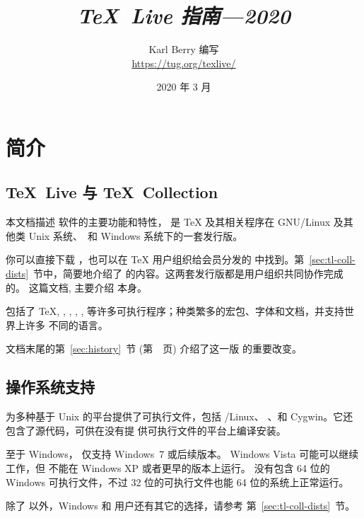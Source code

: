 \documentclass{article}
\title{%
  {\huge \textit{\TeX\ Live 指南---2020}}%
}
\author{Karl Berry 编写 \\[3mm]
        \url{https://tug.org/texlive/}
      }
\date{2020 年 3 月}
\begin{document}
\maketitle


\begin{multicols}{2}
  \tableofcontents
\end{multicols}

% 

\section{简介}
\label{sec:intro}

\subsection{\protect\TeX\protect\ Live 与 \protect\TeX\protect\ Collection}

本文档描述 \TL{} 软件的主要功能和特性，\TL{} 是 \TeX{} 及其相关程序在
GNU/Linux 及其他类 Unix 系统、\MacOSX\ 和 Windows
系统下的一套发行版。

你可以直接下载 \TL{}，也可以在 \TeX{} 用户组织给会员分发的 \TK{}
\DVD 中找到。第~\ref{sec:tl-coll-dists}~节中，简要地介绍了
\DVD 的内容。这两套发行版都是用户组织共同协作完成的。
这篇文档, 主要介绍 \TL{} 本身。

\TL{} 包括了 \TeX{}, \LaTeXe{}, \ConTeXt, \MF, \MP, \BibTeX{}
等许多可执行程序；种类繁多的宏包、字体和文档，并支持世界上许多
不同的语言。

文档末尾的第~\ref{sec:history}~节 (第~\pageref{sec:history}~页)
介绍了这一版 \TL{} 的重要改变。

\subsection{操作系统支持}
\label{sec:os-support}

\TL{} 为多种基于 Unix 的平台提供了可执行文件，包括 \GNU/Linux、
\MacOSX{}、和 Cygwin。它还包含了源代码，可供在没有提
供可执行文件的平台上编译安装。

至于 Windows，\TL{} 仅支持 Windows~7 或后续版本。
Windows Vista 可能可以继续工作，但 \TL{} 不能在 Windows XP
或者更早的版本上运行。\TL{} 没有包含 64 位的 Windows
可执行文件，不过 32 位的可执行文件也能 64 位的系统上正常运行。

除了 \TL{} 以外，Windows 和 \MacOSX 用户还有其它的选择，请参考
第~\ref{sec:tl-coll-dists}~节。
\end{document}
